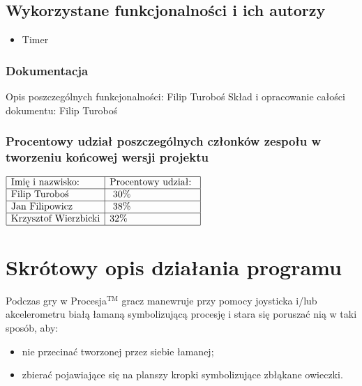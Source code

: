 \documentclass[a4paper,12pt,twoside]{article}
\theoremstyle{plain}
\theoremstyle{definition}
\theoremstyle{remark}
\begin{document}
\subsection{Wykorzystane funkcjonalności i ich autorzy}

\begin{itemize}
	\item Timer
\end{itemize}
\subsubsection{Dokumentacja}
Opis poszczególnych funkcjonalności: Filip Turoboś
Skład i opracowanie całości dokumentu: Filip Turoboś

\subsubsection{Procentowy udział poszczególnych członków zespołu w tworzeniu końcowej wersji projektu}
$\begin{array}{|l|l|l|}
\hline
\textrm{Imię i nazwisko: }& \textrm{Procentowy udział: }\\
\hline
 \textrm{Filip Turoboś}&\textrm{ 30\%}\\
\hline
\textrm{Jan Filipowicz}&\textrm{	38\% 	}\\
\hline
\textrm{Krzysztof Wierzbicki}& \textrm{32\%}\\
\hline
\end{array}$
\newpage
\section{Skrótowy opis działania programu}
Podczas gry w Procesja$^{\textrm{TM}}$ gracz manewruje przy pomocy joysticka i/lub akcelerometru białą łamaną symbolizującą procesję i stara się poruszać nią w taki sposób, aby:
\begin{itemize}
	\item nie przecinać tworzonej przez siebie łamanej; 
	\item zbierać pojawiające się na planszy kropki symbolizujące zbłąkane owieczki.
\end{itemize}
\end{document}
